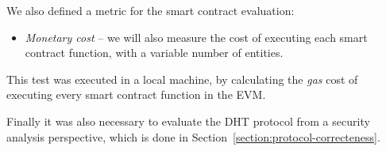 \begin{table}[h!]
\centering
{}
\caption{Test scenarios}
\label{table:test-scenarios}
\end{table}

We also defined a metric for the smart contract evaluation:

\begin{itemize}
  \item \textit{Monetary cost} – we will also measure the cost of executing each smart contract function, with a variable number of entities.
\end{itemize}

This test was executed in a local machine, by calculating the \textit{gas} cost of executing every smart contract function in the \ac{EVM}.

Finally it was also necessary to evaluate the DHT protocol from a security analysis perspective, which is done in Section~\ref{section:protocol-correcteness}.

